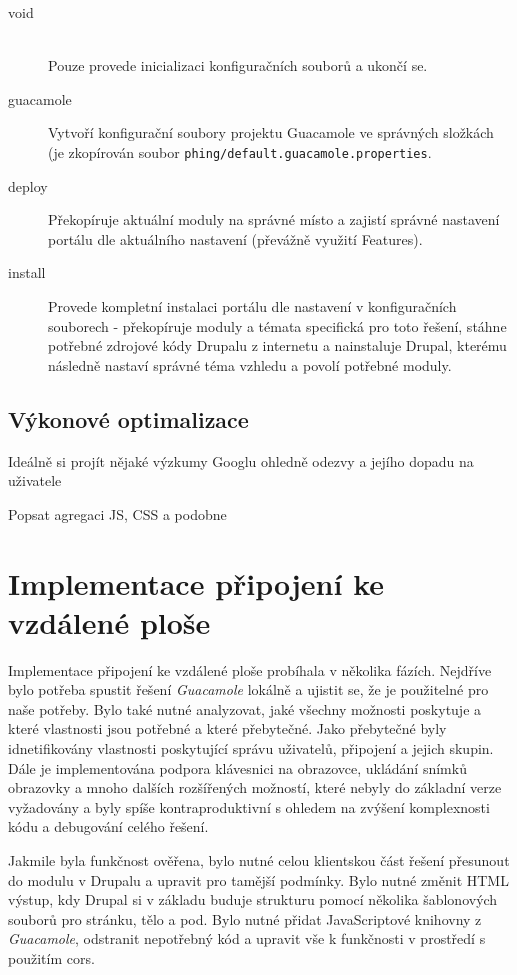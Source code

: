 \begin{description}
  \item[void] \hfill \\
  Pouze provede inicializaci konfiguračních souborů a ukončí se.  
  \item[guacamole] 
  Vytvoří konfigurační soubory projektu Guacamole ve správných složkách (je zkopírován soubor \texttt{phing/default.guacamole.properties}.
  \item[deploy]
  Překopíruje aktuální moduly na správné místo a zajistí správné nastavení portálu dle aktuálního nastavení (převážně využití Features).
  \item[install]
  Provede kompletní instalaci portálu dle nastavení v konfiguračních souborech - překopíruje moduly a témata specifická pro toto řešení, stáhne potřebné zdrojové kódy Drupalu z internetu a nainstaluje Drupal, kterému následně nastaví správné téma vzhledu a povolí potřebné moduly.
\end{description}

\section{Výkonové optimalizace}
Ideálně si projít nějaké výzkumy Googlu ohledně odezvy a jejího dopadu na uživatele

\cite{high-performance-drupal}

Popsat agregaci JS, CSS a podobne 
\cite{website:drupal:optimizing}

\chapter{Implementace připojení ke vzdálené ploše}
\label{chap:implementace-guacamole}
Implementace připojení ke vzdálené ploše probíhala v několika fázích. Nejdříve bylo potřeba spustit řešení \emph{Guacamole} lokálně a ujistit se, že je použitelné pro naše potřeby. Bylo také nutné analyzovat, jaké všechny možnosti poskytuje a které vlastnosti jsou potřebné a které přebytečné. Jako přebytečné byly idnetifikovány vlastnosti poskytující správu uživatelů, připojení a jejich skupin. Dále je implementována podpora klávesnici na obrazovce, ukládání snímků obrazovky a mnoho dalších rozšířených možností, které nebyly do základní verze vyžadovány a byly spíše kontraproduktivní s ohledem na zvýšení komplexnosti kódu a debugování celého řešení. 

Jakmile byla funkčnost ověřena, bylo nutné celou klientskou část řešení přesunout do modulu v Drupalu a upravit pro tamější podmínky. Bylo nutné změnit HTML výstup, kdy Drupal si v základu buduje strukturu pomocí několika šablonových souborů pro stránku, tělo a pod. Bylo nutné přidat JavaScriptové knihovny z \emph{Guacamole}, odstranit nepotřebný kód a upravit vše k funkčnosti v prostředí s použitím \gls{cors}. 

